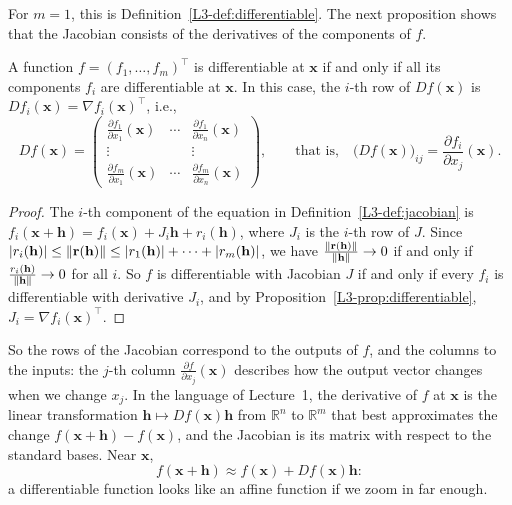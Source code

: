 For $m = 1$, this is Definition~\ref{L3-def:differentiable}. The next proposition shows that the Jacobian consists of the derivatives of the components of $f$.

\begin{proposition}\label{L3-prop:jacobian-entries}
    A function $f = (f_1, \ldots, f_m)^\top$ is differentiable at $\mathbf{x}$ if and only if all its components $f_i$ are differentiable at $\mathbf{x}$. In this case, the $i$-th row of $Df(\mathbf{x})$ is $Df_i(\mathbf{x}) = \nabla f_i(\mathbf{x})^\top$, i.e.,
    \[Df(\mathbf{x}) = \begin{pmatrix} \frac{\partial f_1}{\partial x_1}(\mathbf{x}) & \cdots & \frac{\partial f_1}{\partial x_n}(\mathbf{x}) \\ \vdots & & \vdots \\ \frac{\partial f_m}{\partial x_1}(\mathbf{x}) & \cdots & \frac{\partial f_m}{\partial x_n}(\mathbf{x}) \end{pmatrix}, \qquad \text{that is,} \quad \big(Df(\mathbf{x})\big)_{ij} = \frac{\partial f_i}{\partial x_j}(\mathbf{x}).\]
\end{proposition}

\begin{proof}
    The $i$-th component of the equation in Definition~\ref{L3-def:jacobian} is $f_i(\mathbf{x} + \mathbf{h}) = f_i(\mathbf{x}) + J_i\mathbf{h} + r_i(\mathbf{h})$, where $J_i$ is the $i$-th row of $J$. Since $|r_i(\mathbf{h})| \leq \lVert \mathbf{r}(\mathbf{h}) \rVert \leq |r_1(\mathbf{h})| + \cdots + |r_m(\mathbf{h})|$, we have $\frac{\lVert \mathbf{r}(\mathbf{h}) \rVert}{\lVert \mathbf{h} \rVert} \to 0$ if and only if $\frac{r_i(\mathbf{h})}{\lVert \mathbf{h} \rVert} \to 0$ for all $i$. So $f$ is differentiable with Jacobian $J$ if and only if every $f_i$ is differentiable with derivative $J_i$, and by Proposition~\ref{L3-prop:differentiable}, $J_i = \nabla f_i(\mathbf{x})^\top$.
\end{proof}

So the rows of the Jacobian correspond to the outputs of $f$, and the columns to the inputs: the $j$-th column $\frac{\partial f}{\partial x_j}(\mathbf{x})$ describes how the output vector changes when we change $x_j$. In the language of Lecture~1, the derivative of $f$ at $\mathbf{x}$ is the linear transformation $\mathbf{h} \mapsto Df(\mathbf{x})\mathbf{h}$ from $\mathbb{R}^n$ to $\mathbb{R}^m$ that best approximates the change $f(\mathbf{x} + \mathbf{h}) - f(\mathbf{x})$, and the Jacobian is its matrix with respect to the standard bases. Near $\mathbf{x}$,
\[f(\mathbf{x} + \mathbf{h}) \approx f(\mathbf{x}) + Df(\mathbf{x})\mathbf{h}:\]
a differentiable function looks like an affine function if we zoom in far enough.

